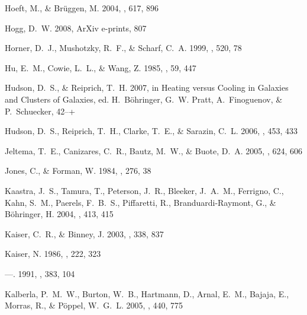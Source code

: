 \documentclass[12pt,preprint]{aastex}
\begin{document}
\begin{thebibliography}{139}
{Hoeft}, M., \& {Br{\"u}ggen}, M. 2004, \apj, 617, 896

{Hogg}, D.~W. 2008, ArXiv e-prints, 807

{Horner}, D.~J., {Mushotzky}, R.~F., \& {Scharf}, C.~A. 1999, \apj, 520, 78

{Hu}, E.~M., {Cowie}, L.~L., \& {Wang}, Z. 1985, \apjs, 59, 447

{Hudson}, D.~S., \& {Reiprich}, T.~H. 2007, in Heating versus Cooling in
  Galaxies and Clusters of Galaxies, ed. H.~{B{\"o}hringer}, G.~W. {Pratt},
  A.~{Finoguenov}, \& P.~{Schuecker}, 42--+

{Hudson}, D.~S., {Reiprich}, T.~H., {Clarke}, T.~E., \& {Sarazin}, C.~L. 2006,
  \aap, 453, 433

{Jeltema}, T.~E., {Canizares}, C.~R., {Bautz}, M.~W., \& {Buote}, D.~A. 2005,
  \apj, 624, 606

{Jones}, C., \& {Forman}, W. 1984, \apj, 276, 38

{Kaastra}, J.~S., {Tamura}, T., {Peterson}, J.~R., {Bleeker}, J.~A.~M.,
  {Ferrigno}, C., {Kahn}, S.~M., {Paerels}, F.~B.~S., {Piffaretti}, R.,
  {Branduardi-Raymont}, G., \& {B{\" o}hringer}, H. 2004, \aap, 413, 415

{Kaiser}, C.~R., \& {Binney}, J. 2003, \mnras, 338, 837

{Kaiser}, N. 1986, \mnras, 222, 323

---. 1991, \apj, 383, 104

{Kalberla}, P.~M.~W., {Burton}, W.~B., {Hartmann}, D., {Arnal}, E.~M.,
  {Bajaja}, E., {Morras}, R., \& {P{\"o}ppel}, W.~G.~L. 2005, \aap, 440, 775


\end{thebibliography}
\end{document}
